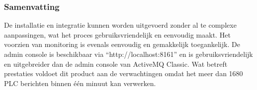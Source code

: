 \subsubsection{Samenvatting}
De installatie en integratie kunnen worden uitgevoerd zonder al te complexe aanpassingen, 
wat het proces gebruiksvriendelijk en eenvoudig maakt.
Het voorzien van monitoring is evenals eenvoudig en gemakkelijk toegankelijk. 
De admin console is beschikbaar via ``http://localhost:8161'' en is gebruiksvriendelijk en uitgebreider dan de admin console van ActiveMQ Classic.
Wat betreft prestaties voldoet dit product aan de verwachtingen omdat het meer dan 1680 PLC berichten binnen één minuut kan verwerken.